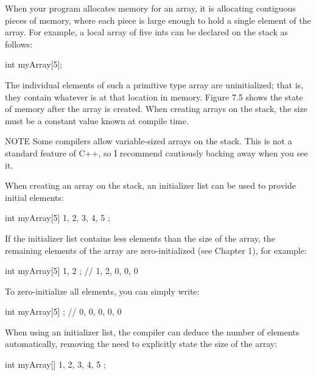 
When your program allocates memory for an array, it is allocating contiguous pieces of memory, where each piece is large enough to hold a single element of the array. For example, a local array of five ints can be declared on the stack as follows:

\begin{cpp}
int myArray[5];
\end{cpp}

The individual elements of such a primitive type array are uninitialized; that is, they contain whatever is at that location in memory. Figure 7.5 shows the state of memory after the array is created. When creating arrays on the stack, the size must be a constant value known at compile time.


\begin{myNotic}{NOTE}
Some compilers allow variable-sized arrays on the stack. This is not a standard feature of C++, so I recommend cautiously backing away when you see it.
\end{myNotic}

When creating an array on the stack, an initializer list can be used to provide initial elements:

\begin{cpp}
int myArray[5] { 1, 2, 3, 4, 5 };
\end{cpp}

If the initializer list contains less elements than the size of the array, the remaining elements of the array are zero-initialized (see Chapter 1), for example:

\begin{cpp}
int myArray[5] { 1, 2 }; // 1, 2, 0, 0, 0
\end{cpp}

To zero-initialize all elements, you can simply write:

\begin{cpp}
int myArray[5] { }; // 0, 0, 0, 0, 0
\end{cpp}

When using an initializer list, the compiler can deduce the number of elements automatically, removing the need to explicitly state the size of the array:

\begin{cpp}
int myArray[] { 1, 2, 3, 4, 5 };
\end{cpp}

